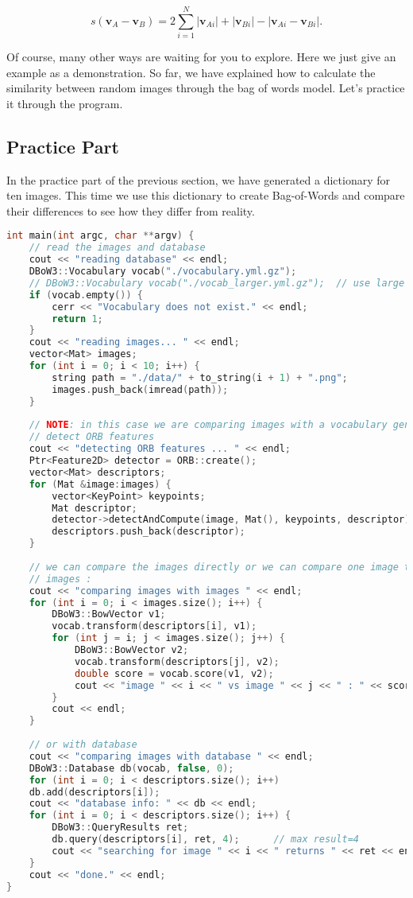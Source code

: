 \begin{equation}
	s\left( {{\mathbf{v}_A} - {\mathbf{v}_B}} \right) = 2\sum\limits_{i = 1}^N {\left| {{\mathbf{v}_{Ai}}} \right| + \left| {{\mathbf{v}_{Bi}}} \right| - \left| {{\mathbf{v}_{Ai}} - {\mathbf{v}_{Bi}}} \right|}.
\end{equation}

Of course, many other ways are waiting for you to explore. Here we just give an example as a demonstration. So far, we have explained how to calculate the similarity between random images through the bag of words model. Let's practice it through the program.

\subsection{Practice Part}
In the practice part of the previous section, we have generated a dictionary for ten images. This time we use this dictionary to create Bag-of-Words and compare their differences to see how they differ from reality.

\begin{lstlisting}[language=c++,caption=slambook/ch12/loop\_closure.cpp]
int main(int argc, char **argv) {
	// read the images and database  
	cout << "reading database" << endl;
	DBoW3::Vocabulary vocab("./vocabulary.yml.gz");
	// DBoW3::Vocabulary vocab("./vocab_larger.yml.gz");  // use large vocab if you want: 
	if (vocab.empty()) {
		cerr << "Vocabulary does not exist." << endl;
		return 1;
	}
	cout << "reading images... " << endl;
	vector<Mat> images;
	for (int i = 0; i < 10; i++) {
		string path = "./data/" + to_string(i + 1) + ".png";
		images.push_back(imread(path));
	}
	
	// NOTE: in this case we are comparing images with a vocabulary generated by themselves, this may lead to overfit.
	// detect ORB features
	cout << "detecting ORB features ... " << endl;
	Ptr<Feature2D> detector = ORB::create();
	vector<Mat> descriptors;
	for (Mat &image:images) {
		vector<KeyPoint> keypoints;
		Mat descriptor;
		detector->detectAndCompute(image, Mat(), keypoints, descriptor);
		descriptors.push_back(descriptor);
	}
	
	// we can compare the images directly or we can compare one image to a database 
	// images :
	cout << "comparing images with images " << endl;
	for (int i = 0; i < images.size(); i++) {
		DBoW3::BowVector v1;
		vocab.transform(descriptors[i], v1);
		for (int j = i; j < images.size(); j++) {
			DBoW3::BowVector v2;
			vocab.transform(descriptors[j], v2);
			double score = vocab.score(v1, v2);
			cout << "image " << i << " vs image " << j << " : " << score << endl;
		}
		cout << endl;
	}
	
	// or with database 
	cout << "comparing images with database " << endl;
	DBoW3::Database db(vocab, false, 0);
	for (int i = 0; i < descriptors.size(); i++)
	db.add(descriptors[i]);
	cout << "database info: " << db << endl;
	for (int i = 0; i < descriptors.size(); i++) {
		DBoW3::QueryResults ret;
		db.query(descriptors[i], ret, 4);      // max result=4
		cout << "searching for image " << i << " returns " << ret << endl << endl;
	}
	cout << "done." << endl;
}
\end{lstlisting}

